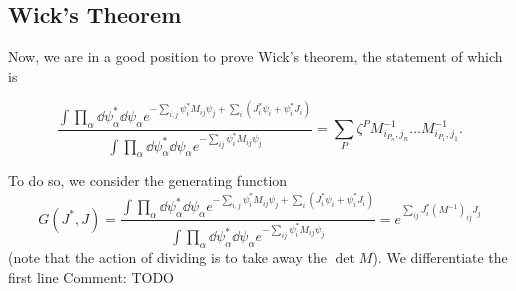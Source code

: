 \documentclass[twoside,symmetric, openany, 12pt]{./tuftebook}
\theoremstyle{definition}
\theoremstyle{definition}
\theoremstyle{definition}
\renewcommand\comment[1]{ {\color{red} Comment: #1}}
\begin{document}
	\subsection{Wick's Theorem}
	Now, we are in a good position to prove Wick's theorem, the statement of which is
\begin{tcolorbox}[title=Wick's Theorem]
\[
	\frac{\int \prod_\alpha \dd{\psi_\alpha^*}\dd{\psi_\alpha} e^{-\sum_{i,j} \psi_i^* M_{ij} \psi_j + \sum_i (J_i^* \psi_i + \psi_i^* J_i)}}{\int \prod_\alpha \dd{\psi_\alpha^*}\dd{\psi_\alpha} e^{-\sum_{ij} \psi_i^* M_{ij} \psi_j}}=\sum_P \zeta^P M^{-1}_{i_{P_n}, j_n} \dots M^{-1}_{i_{P_1}, j_1}
.\] 	
\end{tcolorbox}
	To do so, we consider the generating function
	\[
		G(J^*, J) = \frac{\int \prod_\alpha \dd{\psi_\alpha^*}\dd{\psi_\alpha} e^{-\sum_{i,j} \psi_i^* M_{ij} \psi_j + \sum_i (J_i^* \psi_i + \psi_i^* J_i)}}{\int \prod_\alpha \dd{\psi_\alpha^*}\dd{\psi_\alpha} e^{-\sum_{ij} \psi_i^* M_{ij} \psi_j}}=e^{\sum_{ij} J_i^* (M^{-1})_{ij}J_j}
	\]
	(note that the action of dividing is to take away the $\det M$). We differentiate the first line \comment{TODO}
\end{document}
